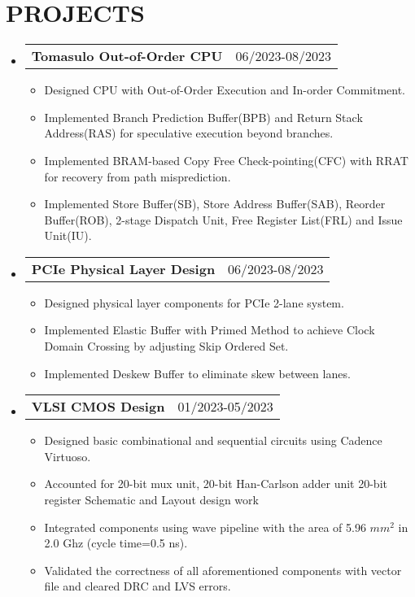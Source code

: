 \documentclass[letterpaper,11pt]{article}
\makeatletter
\newcommand{\resumeItemOne}[1]{
  \item\small{#1}
}
\newcommand{\resumeSubheadingNoTitle}[2]{
  \vspace{-1pt}\item
    \begin{tabular*}{0.97\textwidth}[t]{l@{\extracolsep{\fill}}r}
      \textbf{#1} & #2 %
    \end{tabular*}\vspace{-5pt}
}
\newcommand{\resumeSubHeadingListStart}{\begin{itemize}[leftmargin=*]}
\newcommand{\resumeSubHeadingListEnd}{\end{itemize}\vspace{-5pt}}
\newcommand{\resumeItemListStart}{\begin{itemize}}
\newcommand{\resumeItemListEnd}{\end{itemize}\vspace{-10pt}}
\makeatother
\begin{document}
\section{PROJECTS}
\resumeSubHeadingListStart
\resumeSubheadingNoTitle
    {Tomasulo Out-of-Order CPU}{06/2023-08/2023}
\resumeItemListStart
	\resumeItemOne{Designed CPU with Out-of-Order Execution and In-order Commitment.}
	\resumeItemOne{Implemented Branch Prediction Buffer(BPB) and Return Stack Address(RAS) for speculative execution beyond branches.}
	\resumeItemOne{Implemented BRAM-based Copy Free Check-pointing(CFC) with RRAT for recovery from path misprediction.}
	\resumeItemOne{Implemented Store Buffer(SB), Store Address Buffer(SAB), Reorder Buffer(ROB), 2-stage Dispatch Unit, Free Register List(FRL) and Issue Unit(IU).}
\resumeItemListEnd
\resumeSubheadingNoTitle
    {PCIe Physical Layer Design}{06/2023-08/2023}
\resumeItemListStart
	\resumeItemOne{Designed physical layer components for PCIe 2-lane system.}
	\resumeItemOne{Implemented Elastic Buffer with Primed Method to achieve Clock Domain Crossing by adjusting Skip Ordered Set.}
	\resumeItemOne{Implemented Deskew Buffer to eliminate skew between lanes.}
\resumeItemListEnd
\resumeSubheadingNoTitle
    {VLSI CMOS Design}{01/2023-05/2023}
\resumeItemListStart
	\resumeItemOne{Designed basic combinational and sequential circuits using Cadence Virtuoso.}
	\resumeItemOne{Accounted for 20-bit mux unit, 20-bit Han-Carlson adder unit 20-bit register Schematic and Layout design work}
	\resumeItemOne{Integrated components using wave pipeline with the area of 5.96 $mm^2$ in 2.0 Ghz (cycle time=0.5 ns).}
	\resumeItemOne{Validated the correctness of all aforementioned components with vector file and cleared DRC and LVS errors.}
\resumeItemListEnd
\resumeSubHeadingListEnd
\end{document}
